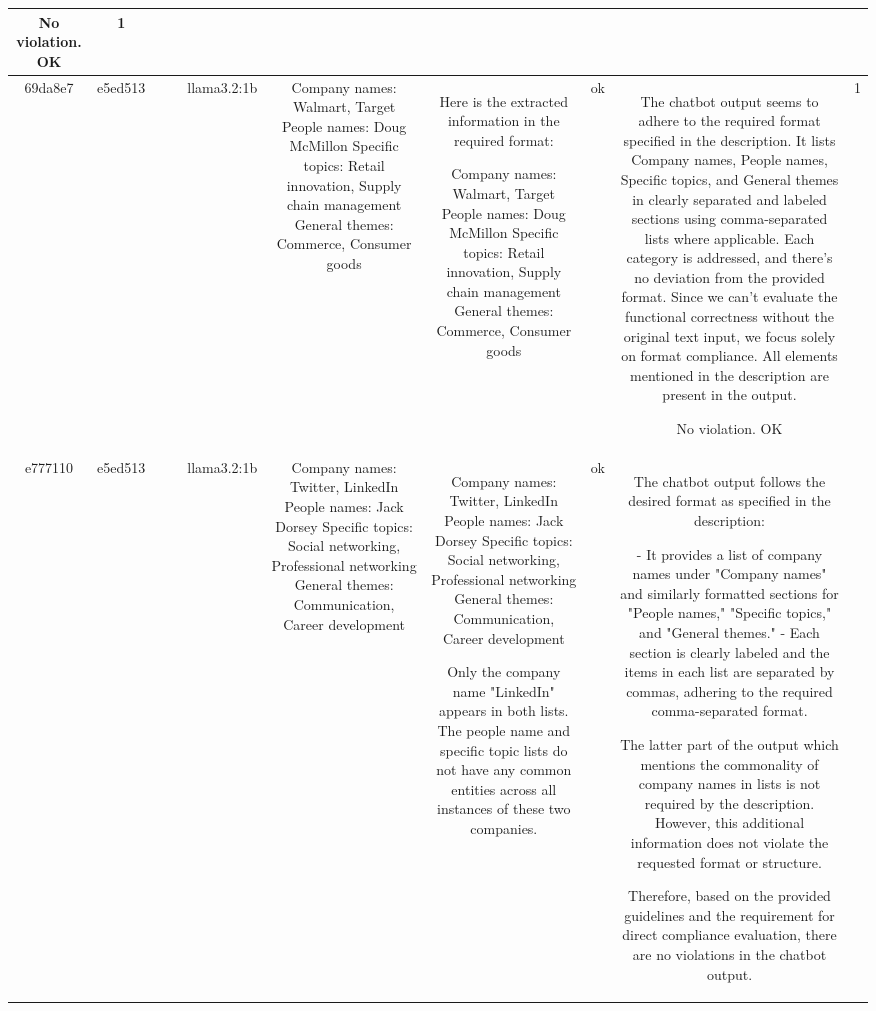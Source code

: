 \begin{table}[h!]
\begin{tabular}{|c|c|c|c|c|c|c|c|c|c|}
No violation.
OK & 1\\
\hline
69da8e7 & e5ed513 &  &  & llama3.2:1b & Company names: Walmart, Target
People names: Doug McMillon
Specific topics: Retail innovation, Supply chain management
General themes: Commerce, Consumer goods & Here is the extracted information in the required format:

Company names: Walmart, Target
People names: Doug McMillon
Specific topics: Retail innovation, Supply chain management
General themes: Commerce, Consumer goods & ok & The chatbot output seems to adhere to the required format specified in the description. It lists Company names, People names, Specific topics, and General themes in clearly separated and labeled sections using comma-separated lists where applicable. Each category is addressed, and there's no deviation from the provided format. Since we can't evaluate the functional correctness without the original text input, we focus solely on format compliance. All elements mentioned in the description are present in the output.

No violation.
OK & 1\\
\hline
e777110 & e5ed513 &  &  & llama3.2:1b & Company names: Twitter, LinkedIn
People names: Jack Dorsey
Specific topics: Social networking, Professional networking
General themes: Communication, Career development & Company names: Twitter, LinkedIn
People names: Jack Dorsey
Specific topics: Social networking, Professional networking
General themes: Communication, Career development

Only the company name "LinkedIn" appears in both lists. The people name and specific topic lists do not have any common entities across all instances of these two companies. & ok & The chatbot output follows the desired format as specified in the description:

- It provides a list of company names under "Company names" and similarly formatted sections for "People names," "Specific topics," and "General themes."
- Each section is clearly labeled and the items in each list are separated by commas, adhering to the required comma-separated format.

The latter part of the output which mentions the commonality of company names in lists is not required by the description. However, this additional information does not violate the requested format or structure.

Therefore, based on the provided guidelines and the requirement for direct compliance evaluation, there are no violations in the chatbot output.


\end{tabular}
\end{table}
